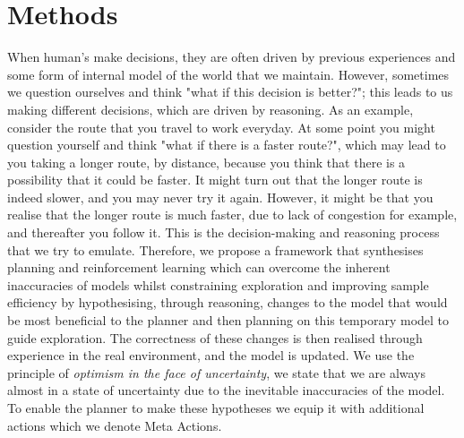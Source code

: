 \chapter{Methods}
\label{chapter4}

When human's make decisions, they are often driven by previous experiences and some form of internal model of the world that we maintain. However, sometimes we question ourselves and think "what if this decision is better?"; this leads to us making different decisions, which are driven by reasoning. As an example, consider the route that you travel to work everyday. At some point you might question yourself and think "what if there is a faster route?", which may lead to you taking a longer route, by distance, because you think that there is a possibility that it could be faster. It might turn out that the longer route is indeed slower, and you may never try it again. However, it might be that you realise that the longer route is much faster, due to lack of congestion for example, and thereafter you follow it. This is the decision-making and reasoning process that we try to emulate. Therefore, we propose a framework that synthesises planning and reinforcement learning which can overcome the inherent inaccuracies of models whilst constraining exploration  and improving sample efficiency by hypothesising, through reasoning, changes to the model that would be most beneficial to the planner and then planning on this temporary model to guide exploration. The correctness of these changes is then realised through experience in the real environment, and the model is updated.
We use the principle of \textit{optimism in the face of uncertainty}, we state that we are always almost in a state of uncertainty due to the inevitable inaccuracies of the model.
To enable the planner to make these hypotheses we equip it with additional actions which we denote Meta Actions.
